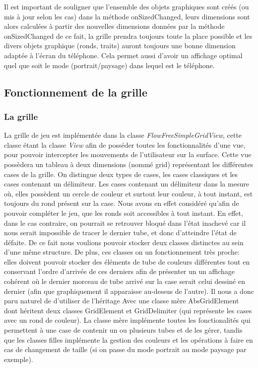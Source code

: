 \documentclass[12pt, a4paper]{article}%
\begin{document}
    Il est important de souligner que l'ensemble des objets graphiques sont créés (ou mis à jour selon les cas) dans la méthode
    onSizedChanged, leurs dimensions sont alors calculées à partir des nouvelles dimensions données par la méthode onSizedChanged
    de ce fait, la grille prendra toujours toute la place possible et les divers objets graphique (ronds, traits) auront toujours
    une bonne dimension adaptée à l'écran du téléphone. Cela permet aussi d'avoir un affichage optimal quel que soit le mode
    (portrait/paysage) dans lequel est le téléphone.
    \subsection{Fonctionnement de la grille}
    \subsubsection{La grille}
    La grille de jeu est implémentée dans la classe \textit{FlowFreeSimpleGridView}, cette classe étant la classe \textit{View}
afin de posséder toutes les fonctionnalités d'une vue, pour pouvoir intercepter les mouvements de l'utilisateur sur la surface.
Cette vue possèdera un tableau à deux dimensions (nommé grid) représentant les différentes cases de la grille. On distingue deux
types de cases, les cases classiques et les cases contenant un délimiteur. Les cases contenant un délimiteur dans la mesure où,
elles possèdent un cercle de couleur et surtout leur couleur, à tout instant, est toujours du rond présent sur la case. Nous avons
en effet considéré qu'afin de pouvoir compléter le jeu, que les ronds soit accessibles à tout instant. En effet, dans le cas
contraire, on pourrait se retrouver bloqué dans l'état inachevé car il nous serait impossible de tracer le dernier tube, et donc
d'atteindre l'état de défaite. De ce fait nous voulions pouvoir stocker deux classes distinctes au sein d'une même structure. De
plus, ces classes on un fonctionnement très proche: elles doivent pouvoir stocker des éléments de tube de couleurs différentes
tout en conservant l'ordre d'arrivée de ces derniers afin de présenter un un affichage cohérent où le dernier morceau de tube
arrivé sur la case serait celui dessiné en dernier (afin que graphiquement il apparaisse au-dessus de l'autre). Il nous a donc
paru naturel de d'utiliser de l'héritage Avec une classe mère AbsGridElement dont héritent deux classes GridElement et
GridDelimiter (qui représente les cases avec un rond de couleur). La classe mère implémente toutes les fonctionalités qui
permettent à une case de contenir un ou plusieurs tubes et de les gérer, tandis que les classes filles implémente la gestion des
couleurs et les opérations à faire en cas de changement de taille (si on passe du mode portrait au mode paysage par exemple).
\end{document}
